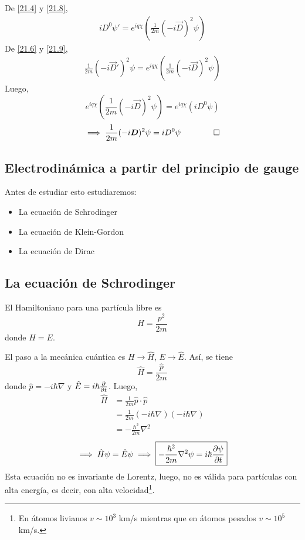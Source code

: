 \begin{prueba}
De \eqref{21.4} y \eqref{21.8}, 
\begin{align}\label{21.9}
  iD^0\psi'=e^{iq\chi }\left(\frac{1}{2m}(-i\vec{D})^2\psi \right)
\end{align}
De \eqref{21.6} y \eqref{21.9},
\begin{align}\label{21.10}
  \frac{1}{2m}(-i\vec{D}')^2\psi=e^{iq\chi }\left(\frac{1}{2m}(-i\vec{D})^2\psi\right)
\end{align}
Luego,
\begin{equation}
  e^{iq\chi }\left(\frac{1}{2m}(-i\vec{D})^2\psi \right)=e^{iq\chi }(iD^0\psi )
\end{equation}
\begin{equation}
  \implies \frac{1}{2m}(-i\vec{D})^2\psi =iD^0 \psi \qquad \qed 
\end{equation}
\end{prueba}

\subsection{Electrodinámica a partir del principio de gauge}
Antes de estudiar esto estudiaremos:
\begin{itemize}
	\item La ecuación de Schrodinger
	\item La ecuación de Klein-Gordon
	\item La ecuación de Dirac
\end{itemize}

\subsection{La ecuación de Schrodinger}
El Hamiltoniano para una partícula libre es
\begin{equation}
H=  \frac{p^2}{2m}
\end{equation}
donde $H=E$.

El paso a la mecánica cuántica es $H\to \hat{H}$, $E\to \hat{E}$. Así, se tiene
\begin{equation}
  \hat{H}=\frac{\hat{p}}{2m}
\end{equation}
donde $\hat{p}=-i\hbar\nabla$ y $\hat{E}=i\hbar\pdv{t}$. Luego,
\begin{align}
  \hat{H}&=\frac{1}{2m}\hat{p}\cdot\hat{p}\\
  &=\frac{1}{2m}(-i\hbar\nabla)(-i\hbar\nabla)\\
  &=-\frac{\hbar^2}{2m}\nabla^2
\end{align}
\begin{equation}
  \implies \hat{H}\psi=\hat{E}\psi\implies \boxed{-\frac{\hbar^2}{2m}\nabla^2\psi=i\hbar\pdv{\psi}{t}}
\end{equation}
Esta ecuación no es invariante de Lorentz, luego, no es válida para partículas con alta energía, es decir, con alta velocidad\footnote{En átomos livianos $v\sim 10^3$ km/s mientras que en átomos pesados $v\sim 10^5$ km/s.}.

